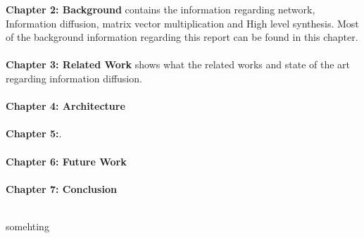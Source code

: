 \textbf{Chapter 2: Background} contains the information regarding network, Information diffusion, matrix vector multiplication and High level synthesis. Most of the background information regarding this report can be found in this chapter. \\ \hfil \\ \hfil
\textbf{Chapter 3: Related Work} shows what the related works and state of the art regarding information diffusion.\\ \hfil \\ \hfil
\textbf{Chapter 4: Architecture}  \\ \hfil \\ \hfil
\textbf{Chapter 5:}.  \\ \hfil \\ \hfil
\textbf{Chapter 6: Future Work}  \\ \hfil \\ \hfil
\textbf{Chapter 7: Conclusion} \\ \hfil \\ \hfil

somehting